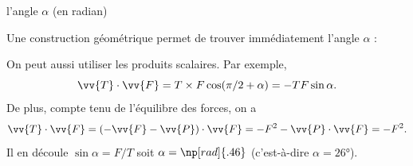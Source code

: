 
\begin{enonce}
l'angle $\alpha$ (en radian)
\end{enonce}


\begin{corrige}
	Une construction géométrique permet de trouver immédiatement l'angle $\alpha$ : 
	\begin{center}
	\end{center}
	On peut aussi utiliser les produits scalaires. Par exemple,
	\[
		\vv{T}\cdot \vv{F}=T\times F\cos(\pi/2+\alpha)=-TF\sin\alpha.
	\]
	De plus, compte tenu de l'équilibre des forces, on a 
	\[
		\vv{T}\cdot \vv{F}=
		(-\vv{F}-\vv{P})\cdot \vv{F}=
		-F^2-\vv{P}\cdot \vv{F}=-F^2.
	\]
	Il en découle $\sin\alpha=F/T$ soit $\alpha=\np[rad]{.46}$ (c'est-à-dire $\alpha=\ang{26}$).
\end{corrige}


\finEntrainement










\hauteurLargeurCadreReponse		{6mm}{3cm}
\typeEntrainement				{} %
\initialisationEntrainement


